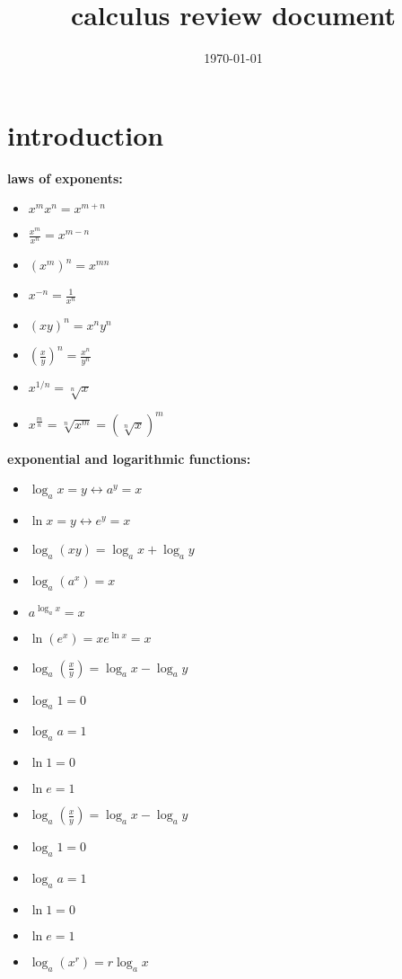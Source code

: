 \documentclass{article}
\title{calculus review document}
\date{\today}
\begin{document}
\maketitle

\section*{introduction}

\textbf{laws of exponents:} 
	\begin{itemize}
		\item $x^mx^n = x^{m+n}$
		\item $\frac{x^m}{x^n} = x^{m-n}$
		\item $(x^m)^n = x^{mn}$
		\item $x^{-n} = \frac{1}{x^n}$
		\item $(xy)^n = x^ny^n$
		\item $(\frac{x}{y})^n = \frac{x^n}{y^n}$ \item $x^{1/n} = \sqrt[n]{x}$
		\item $x^{\frac{m}{n}} = \sqrt[n]{x^m} = (\sqrt[n]{x})^m$
	\end{itemize}

\textbf{exponential and logarithmic functions:}
	\begin{itemize}
		\item $\log_ax = y \leftrightarrow a^y = x$
		\item $\ln x = y \leftrightarrow e^y = x$
		\item $\log_a(xy) = \log_ax + \log_ay$
		\item $\log_a(a^x) = x$
		\item $a^{\log_a x} = x$
		\item $\ln(e^x) = x e^{\ln x} = x$
		\item $\log_a(\frac{x}{y}) = \log_ax - \log_ay$
		\item $\log_a1 = 0$
		\item $\log_aa = 1$
		\item $\ln1 = 0$
		\item $\ln e = 1$
		\item $\log_a(\frac{x}{y}) = \log_ax - \log_ay$
		\item $\log_a1 = 0$
		\item $\log_aa = 1$
		\item $\ln1 = 0$
		\item $\ln e = 1$
		\item $\log_a(x^r) = r\log_ax$
	\end{itemize}
\end{document}
